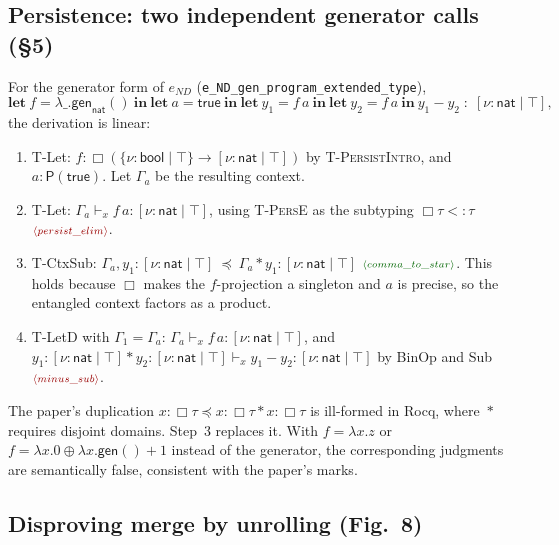 \documentclass[10pt]{article}
\newcommand{\ov}[2]{\{\nu{:}#1 \mid #2\}}          %
\newcommand{\un}[2]{[\nu{:}#1 \mid #2]}            %
\newcommand{\Prec}[1]{\mathsf{P}(#1)}               %
\newcommand{\Nat}{\mathsf{nat}}
\newcommand{\Bool}{\mathsf{bool}}
\newcommand{\pers}{\Box}
\newcommand{\entc}{\mathrel{,}}
\newcommand{\sep}{\mathrel{*}}
\newcommand{\vd}{\vdash_{\!x}}
\newcommand{\sub}{\mathrel{<:}}
\newcommand{\kw}[1]{\ensuremath{\mathbf{#1}}}
\newcommand{\rocq}[1]{\texttt{#1}}
\newcommand{\RN}[1]{\textsc{#1}}
\newcommand{\obl}[1]{\ensuremath{\textcolor{red!60!black}{\scriptstyle\langle #1\rangle}}}
\newcommand{\qed}[1]{\ensuremath{\textcolor{green!40!black}{\scriptstyle\langle #1\rangle}}}
\begin{document}
\subsection{Persistence: two independent generator calls (\S5)}

For the generator form of $e_{\mathit{ND}}$
(\rocq{e\_ND\_gen\_program\_extended\_type}),
\[\kw{let}\ f=\lambda\_.\mathsf{gen}_{\Nat}()\ \kw{in}\ \kw{let}\ a=\mathsf{true}\ \kw{in}\
\kw{let}\ y_1 = f\,a\ \kw{in}\ \kw{let}\ y_2 = f\,a\ \kw{in}\ y_1-y_2 \;:\; \un{\Nat}{\top},\]
the derivation is linear:
\begin{enumerate}
\item T-Let: $f : \pers(\ov{\Bool}{\top}\to\un{\Nat}{\top})$ by \RN{T-PersistIntro}, and
  $a:\Prec{\mathsf{true}}$. Let $\Gamma_a$ be the resulting context.
\item T-Let: $\Gamma_a\vd f\,a:\un{\Nat}{\top}$, using \RN{T-PersE} as the
  subtyping $\pers\tau\sub\tau$ \obl{persist\_elim}.
\item T-CtxSub: $\Gamma_a\entc y_1{:}\un{\Nat}{\top}\ \preceq\ \Gamma_a\sep y_1{:}\un{\Nat}{\top}$
  \qed{comma\_to\_star}. This holds because $\pers$ makes the $f$-projection a
  singleton and $a$ is precise, so the entangled context factors as a product.
\item T-LetD with $\Gamma_1=\Gamma_a$: $\Gamma_a\vd f\,a:\un{\Nat}{\top}$, and
  $y_1{:}\un{\Nat}{\top}\sep y_2{:}\un{\Nat}{\top}\vd y_1-y_2:\un{\Nat}{\top}$ by
  BinOp and Sub \obl{minus\_sub}.
\end{enumerate}
The paper's duplication $x{:}\pers\tau\preceq x{:}\pers\tau\sep x{:}\pers\tau$
is ill-formed in Rocq, where $\sep$ requires disjoint domains. Step~3 replaces
it. With $f=\lambda x.z$ or $f=\lambda x.0\oplus\lambda x.\mathsf{gen}()+1$
instead of the generator, the corresponding judgments are semantically false,
consistent with the paper's \ding{55} marks.

\subsection{Disproving merge by unrolling (Fig.~8)}\label{sec:merge}
\end{document}
